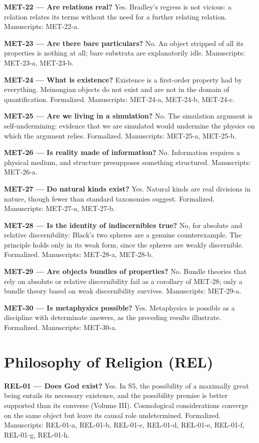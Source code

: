 \documentclass[10pt]{article}
\begin{document}
\textbf{MET-22 --- Are relations real?} Yes. Bradley's regress is not vicious: a relation relates its terms without the need for a further relating relation. Manuscripts: MET-22-a.

\textbf{MET-23 --- Are there bare particulars?} No. An object stripped of all its properties is nothing at all; bare substrata are explanatorily idle. Manuscripts: MET-23-a, MET-23-b.

\textbf{MET-24 --- What is existence?} Existence is a first-order property had by everything. Meinongian objects do not exist and are not in the domain of quantification. Formalized. Manuscripts: MET-24-a, MET-24-b, MET-24-c.

\textbf{MET-25 --- Are we living in a simulation?} No. The simulation argument is self-undermining: evidence that we are simulated would undermine the physics on which the argument relies. Formalized. Manuscripts: MET-25-a, MET-25-b.

\textbf{MET-26 --- Is reality made of information?} No. Information requires a physical medium, and structure presupposes something structured. Manuscripts: MET-26-a.

\textbf{MET-27 --- Do natural kinds exist?} Yes. Natural kinds are real divisions in nature, though fewer than standard taxonomies suggest. Formalized. Manuscripts: MET-27-a, MET-27-b.

\textbf{MET-28 --- Is the identity of indiscernibles true?} No, for absolute and relative discernibility: Black's two spheres are a genuine counterexample. The principle holds only in its weak form, since the spheres are weakly discernible. Formalized. Manuscripts: MET-28-a, MET-28-b.

\textbf{MET-29 --- Are objects bundles of properties?} No. Bundle theories that rely on absolute or relative discernibility fail as a corollary of MET-28; only a bundle theory based on weak discernibility survives. Manuscripts: MET-29-a.

\textbf{MET-30 --- Is metaphysics possible?} Yes. Metaphysics is possible as a discipline with determinate answers, as the preceding results illustrate. Formalized. Manuscripts: MET-30-a.

\section*{Philosophy of Religion (REL)}
\textbf{REL-01 --- Does God exist?} Yes. In S5, the possibility of a maximally great being entails its necessary existence, and the possibility premise is better supported than its converse (Volume III). Cosmological considerations converge on the same object but leave its causal role undetermined. Formalized. Manuscripts: REL-01-a, REL-01-b, REL-01-c, REL-01-d, REL-01-e, REL-01-f, REL-01-g, REL-01-h.
\end{document}
